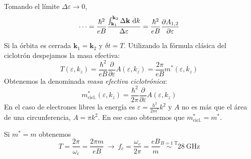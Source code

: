 Tomando el límite $\Delta\varepsilon \to 0$,
\begin{equation}
  \cdots = \frac{\hbar^2}{eB} \frac{\int_{\mathbf{k}_1}^{\mathbf{k}_2}
  \Delta \mathbf{k} \ \text{d}k}{\Delta \varepsilon} =
\frac{\hbar^2}{eB} \frac{\partial A_{1,2}}{\partial \varepsilon}
\end{equation}

Si la órbita es cerrada $\mathbf{k}_1 = \mathbf{k}_2$ y $\delta t =
T$. Utilizando la fórmula clásica del ciclotrón despejamos la masa efectiva:
\begin{equation}
  T(\varepsilon, k_z) = \frac{\hbar^2}{eB} \frac{\partial}{\partial
    \varepsilon} A(\varepsilon,k_z) = \frac{2\pi}{eB}m^* (\varepsilon,k_z)
\end{equation}
Obtenemos la denominada \emph{masa efectiva ciclotrónica}:
\begin{equation}
  m^*_\text{cicl.}(\varepsilon,k_z) = \frac{\hbar^2}{2\pi}\frac{\partial}{\partial \varepsilon}A(\varepsilon,k_z)
\end{equation}
En el caso de electrones libres la energía es $\varepsilon =
\frac{h^2}{2m^*} k^2$ y $A$ no es más que el área de una
circunferencia, $A = \pi k^2$. En ese caso obtenemos que $m^*_\text{cicl.} = m^*$.

Si $m^* =m $ obtenemos
\begin{equation}
  T = \frac{2\pi}{\omega_c} = \frac{2\pi m}{eB} \ \rightarrow \
  f_c = \frac{\omega_c}{2\pi} = \frac{eB}{m} \stackrel{B = \SI{1}{\tesla}}{\sim} \SI{28}{\giga\hertz}
\end{equation}
